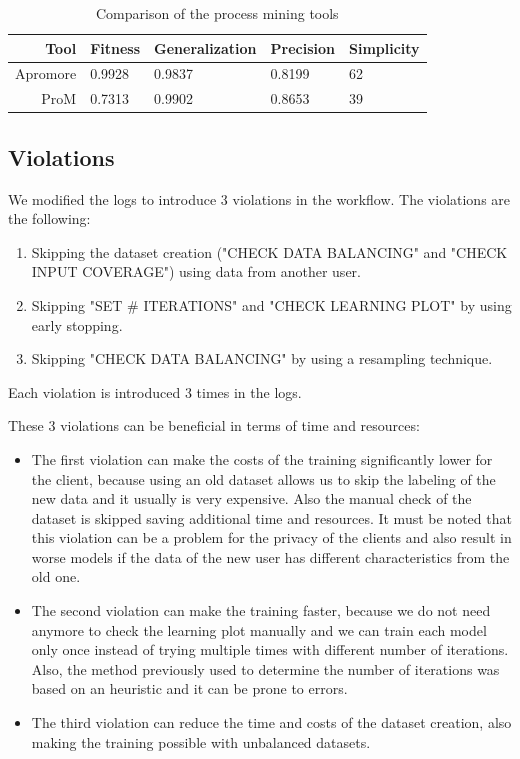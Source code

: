 \begin{table}[H]
\centering
\begin{tabular}{|r|l|l|l|l|}
\hline
\textbf{Tool} & \textbf{Fitness} & \textbf{Generalization} & \textbf{Precision} & \textbf{Simplicity} \\
\hline
Apromore & 0.9928 & 0.9837 & 0.8199 & 62 \\
\hline
ProM & 0.7313 & 0.9902 & 0.8653 & 39 \\
\hline
\end{tabular}
\caption{Comparison of the process mining tools}
\label{tab:process_mining_comparison}
\end{table}

\subsection{Violations}
\label{sec:mining_violations}

We modified the logs to introduce 3 violations in the workflow. The
violations are the following:
\begin{enumerate}
    \item Skipping the dataset creation ("CHECK DATA BALANCING"
        and "CHECK INPUT COVERAGE") using data from another user.
    \item Skipping "SET \# ITERATIONS" and "CHECK LEARNING PLOT" by
        using early stopping.
    \item Skipping "CHECK DATA BALANCING" by using a resampling
        technique.
\end{enumerate}

Each violation is introduced 3 times in the logs.

These 3 violations can be beneficial in terms of time and resources:
\begin{itemize}
    \item The first violation can make the costs of the training significantly
    lower for the client, because using an old dataset allows us to skip 
    the labeling of the new data and it usually is very expensive. 
    Also the manual check of the dataset is skipped saving additional time and
    resources. It must be noted that this violation can be a problem for
    the privacy of the clients and also result in worse models if the data of
    the new user has different characteristics from the old one.
    \item The second violation can make the training faster, because we do not
    need anymore to check the learning plot manually and we can train each
    model only once instead of trying multiple times with different number of
    iterations. Also, the method previously used to determine the number of
    iterations was based on an heuristic and it can be prone to errors.
    \item The third violation can reduce the time and costs of the dataset
    creation, also making the training possible with unbalanced datasets.
\end{itemize}

